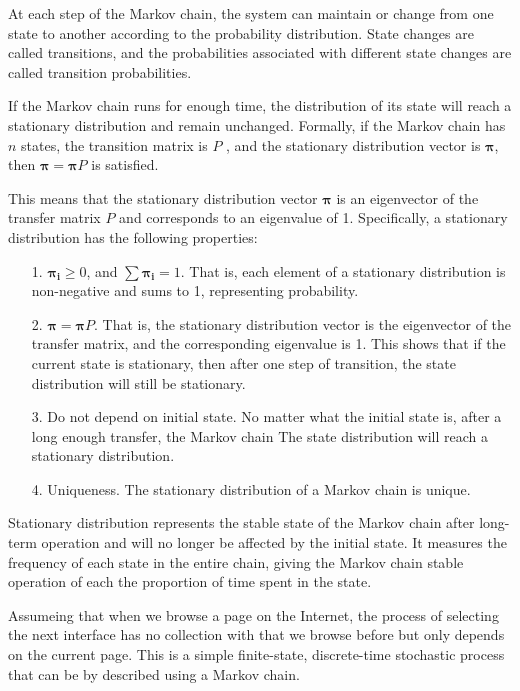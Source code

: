 \documentclass[lettersize,journal,12pt]{IEEEtran}
\begin{document}
At each step of the Markov chain, the system can maintain or change from one state to another according to the probability distribution. State changes are called transitions, and the probabilities associated with different state changes are called transition probabilities.

If the Markov chain runs for enough time, the distribution of its state will reach a stationary distribution and remain unchanged. Formally, if the Markov chain has $n$ states, the transition matrix is $P$
, and the stationary distribution vector is $\boldsymbol{\pi}$, then $\boldsymbol{\pi} = \boldsymbol{\pi} P$ is satisfied.

This means that the stationary distribution vector $\boldsymbol{\pi}$ is an eigenvector of the transfer matrix $P$ and corresponds to an eigenvalue of 1. Specifically, a stationary distribution has the following properties:
\begin{enumerate}
	\item [1.] $\boldsymbol{\pi_i}\geq0$, and $\sum\boldsymbol{\pi_i}=1$. That is, each element of a stationary distribution is non-negative and sums to 1, representing probability.
	\item [2.] $\boldsymbol{\pi} = \boldsymbol{\pi} P$. That is, the stationary distribution vector is the eigenvector of the transfer matrix, and the corresponding eigenvalue is 1. This shows that if the current state is stationary, then after one step of transition, the state distribution will still be stationary.
	\item [3.] Do not depend on initial state. No matter what the initial state is, after a long enough transfer, the Markov chain
	      The state distribution will reach a stationary distribution.
	\item [4.] Uniqueness. The stationary distribution of a Markov chain is unique.
\end{enumerate}

Stationary distribution represents the stable state of the Markov chain after long-term operation and will no longer be affected by the initial state.
It measures the frequency of each state in the entire chain, giving the Markov chain stable operation of each
the proportion of time spent in the state.

Assumeing that when we browse a page on the Internet, the process of selecting the next interface has no collection with that we browse before but only depends on the current page. This is a simple finite-state, discrete-time stochastic process that can be by described using a Markov chain.
\end{document}
